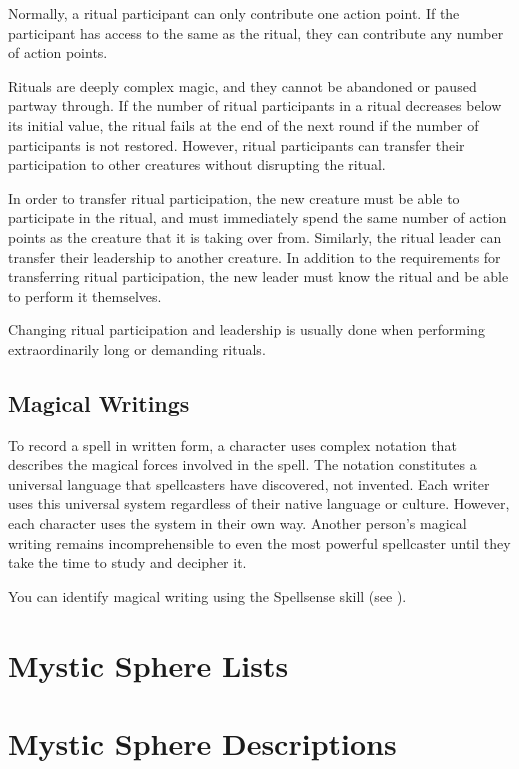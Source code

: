             Normally, a ritual participant can only contribute one action point.
            If the participant has access to the same  as the ritual, they can contribute any number of action points.

            Rituals are deeply complex magic, and they cannot be abandoned or paused partway through.
            If the number of ritual participants in a ritual decreases below its initial value, the ritual fails at the end of the next round if the number of participants is not restored.
            However, ritual participants can transfer their participation to other creatures without disrupting the ritual.

            In order to transfer ritual participation, the new creature must be able to participate in the ritual, and must immediately spend the same number of action points as the creature that it is taking over from.
            Similarly, the ritual leader can transfer their leadership to another creature.
            In addition to the requirements for transferring ritual participation, the new leader must know the ritual and be able to perform it themselves.

            Changing ritual participation and leadership is usually done when performing extraordinarily long or demanding rituals.

    \subsection{Magical Writings}
        To record a spell in written form, a character uses complex notation that describes the magical forces involved in the spell.
        The notation constitutes a universal language that spellcasters have discovered, not invented.
        Each writer uses this universal system regardless of their native language or culture.
        However, each character uses the system in their own way.
        Another person's magical writing remains incomprehensible to even the most powerful spellcaster until they take the time to study and decipher it.

        You can identify magical writing using the Spellsense skill (see ).


\section{Mystic Sphere Lists}\label{Mystic Sphere Lists}

    

\section{Mystic Sphere Descriptions}\label{Mystic Sphere Descriptions}

    
